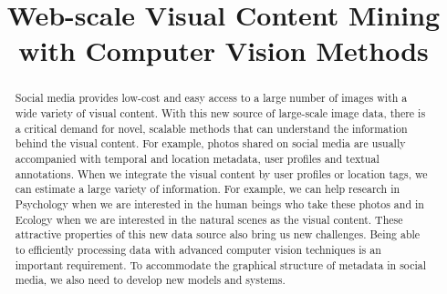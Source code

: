 \documentclass{iuphd_proposal}
\title{Web-scale Visual Content Mining with Computer Vision Methods}
\author{}
\date{}
\begin{document}
\maketitle






\begin{abstract}
Social media provides low-cost and easy access to a large number of images with a wide variety of visual content. With this new source of large-scale image data, there is a critical demand for novel, scalable methods that can understand the information behind the visual content. For example, photos shared on social media are usually accompanied with temporal and location metadata, user profiles and textual annotations. When we integrate the visual content by user profiles or location tags, we can estimate a large variety of information. For example, we can help research in Psychology when we are interested in the human beings who take these photos and in Ecology when we are interested in the natural scenes as the visual content. 
These attractive properties of this new data source also bring us new challenges.
Being able to efficiently processing data with advanced computer vision techniques is an important requirement.
To accommodate the graphical structure of metadata in social media, we also need to develop new models and systems.


\end{abstract}
\end{document}
